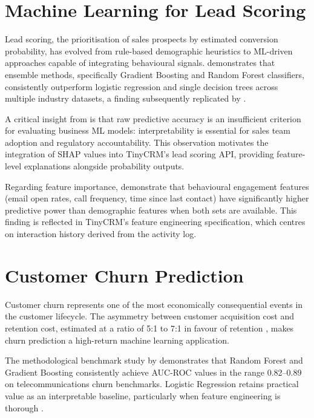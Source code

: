 \section{Machine Learning for Lead Scoring}

Lead scoring, the prioritisation of sales prospects by estimated conversion
probability, has evolved from rule-based demographic heuristics to
ML-driven approaches capable of integrating behavioural signals.
\citet{baesens2002} demonstrates that ensemble methods, specifically
Gradient Boosting and Random Forest classifiers, consistently outperform
logistic regression and single decision trees across multiple industry
datasets, a finding subsequently replicated by \citet{chen2016xgboost}.

A critical insight from \citet{verbeke2012} is that raw predictive accuracy
is an insufficient criterion for evaluating business ML models:
interpretability is essential for sales team adoption and regulatory
accountability. This observation motivates the integration of SHAP values
\citep{lundberg2017shap} into TinyCRM's lead scoring API, providing
feature-level explanations alongside probability outputs.

Regarding feature importance, \citet{tsai2010} demonstrate that
behavioural engagement features (email open rates, call frequency, time
since last contact) have significantly higher predictive power than
demographic features when both sets are available. This finding is
reflected in TinyCRM's feature engineering specification, which centres
on interaction history derived from the activity log.

\section{Customer Churn Prediction}

Customer churn represents one of the most economically consequential
events in the customer lifecycle. The asymmetry between customer
acquisition cost and retention cost, estimated at a ratio of 5:1 to 7:1
in favour of retention \citep{reichheld2001}, makes churn prediction a
high-return machine learning application.

The methodological benchmark study by \citet{verbeke2012} demonstrates
that Random Forest and Gradient Boosting consistently achieve AUC-ROC
values in the range 0.82--0.89 on telecommunications churn benchmarks.
Logistic Regression retains practical value as an interpretable baseline,
particularly when feature engineering is thorough \citep{coussement2008}.

